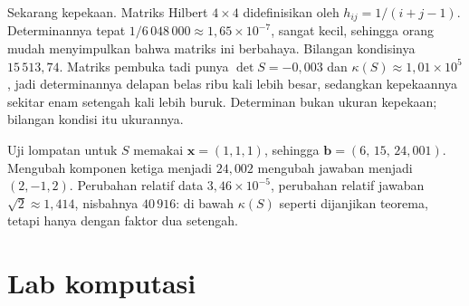 Sekarang kepekaan. Matriks Hilbert $4\times4$ didefinisikan oleh $h_{ij}=1/(i+j-1)$.
Determinannya tepat $1/6\,048\,000\approx1{,}65\times10^{-7}$, sangat kecil, sehingga orang
mudah menyimpulkan bahwa matriks ini berbahaya. Bilangan kondisinya $15\,513{,}74$. Matriks
pembuka tadi punya $\det S=-0{,}003$ dan $\kappa(S)\approx1{,}01\times10^{5}$, jadi
determinannya delapan belas ribu kali lebih besar, sedangkan kepekaannya sekitar enam
setengah kali lebih buruk. Determinan bukan ukuran kepekaan; bilangan kondisi itu ukurannya.

Uji lompatan untuk $S$ memakai $\mathbf{x}=(1,1,1)$, sehingga
$\mathbf{b}=(6,\,15,\,24{,}001)$. Mengubah komponen ketiga menjadi $24{,}002$ mengubah
jawaban menjadi $(2,-1,2)$. Perubahan relatif data $3{,}46\times10^{-5}$, perubahan relatif
jawaban $\sqrt{2}\approx1{,}414$, nisbahnya $40\,916$: di bawah $\kappa(S)$ seperti
dijanjikan teorema, tetapi hanya dengan faktor dua setengah.


\section{Lab komputasi}

